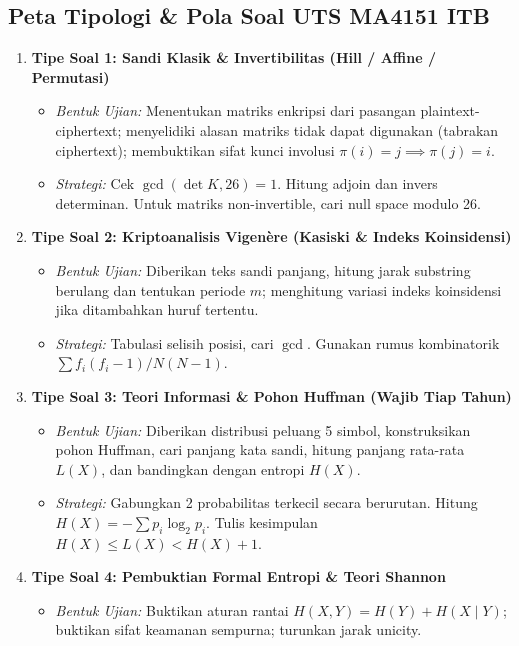 \documentclass[11pt,a4paper]{article}
\begin{document}
\subsection{Peta Tipologi \& Pola Soal UTS MA4151 ITB}
\begin{enumerate}[leftmargin=*]
    \item \textbf{Tipe Soal 1: Sandi Klasik \& Invertibilitas (Hill / Affine / Permutasi)}
    \begin{itemize}
        \item \textit{Bentuk Ujian:} Menentukan matriks enkripsi dari pasangan plaintext-ciphertext; menyelidiki alasan matriks tidak dapat digunakan (tabrakan ciphertext); membuktikan sifat kunci involusi $\pi(i) = j \implies \pi(j) = i$.
        \item \textit{Strategi:} Cek $\gcd(\det K, 26) = 1$. Hitung adjoin dan invers determinan. Untuk matriks non-invertible, cari null space modulo 26.
    \end{itemize}
    \item \textbf{Tipe Soal 2: Kriptoanalisis Vigen\`ere (Kasiski \& Indeks Koinsidensi)}
    \begin{itemize}
        \item \textit{Bentuk Ujian:} Diberikan teks sandi panjang, hitung jarak substring berulang dan tentukan periode $m$; menghitung variasi indeks koinsidensi jika ditambahkan huruf tertentu.
        \item \textit{Strategi:} Tabulasi selisih posisi, cari $\gcd$. Gunakan rumus kombinatorik $\sum f_i(f_i-1) / N(N-1)$.
    \end{itemize}
    \item \textbf{Tipe Soal 3: Teori Informasi \& Pohon Huffman (Wajib Tiap Tahun)}
    \begin{itemize}
        \item \textit{Bentuk Ujian:} Diberikan distribusi peluang 5 simbol, konstruksikan pohon Huffman, cari panjang kata sandi, hitung panjang rata-rata $L(X)$, dan bandingkan dengan entropi $H(X)$.
        \item \textit{Strategi:} Gabungkan 2 probabilitas terkecil secara berurutan. Hitung $H(X) = -\sum p_i \log_2 p_i$. Tulis kesimpulan $H(X) \le L(X) < H(X) + 1$.
    \end{itemize}
    \item \textbf{Tipe Soal 4: Pembuktian Formal Entropi \& Teori Shannon}
    \begin{itemize}
        \item \textit{Bentuk Ujian:} Buktikan aturan rantai $H(X, Y) = H(Y) + H(X \mid Y)$; buktikan sifat keamanan sempurna; turunkan jarak unicity.

\end{itemize}
\end{enumerate}
\end{document}
